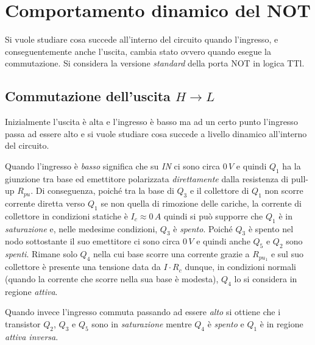 \documentclass[12pt, a4paper]{report}
\begin{document}
\section{Comportamento dinamico del NOT}
Si vuole studiare cosa succede all'interno del circuito quando l'ingresso, e conseguentemente anche l'uscita, cambia stato ovvero quando esegue la commutazione. Si considera la versione \textit{standard} della porta NOT in logica TTl.

\subsection{Commutazione dell'uscita $H \rightarrow L$}
Inizialmente l'uscita è alta e l'ingresso è basso ma ad un certo punto l'ingresso passa ad essere alto e si vuole studiare cosa succede a livello dinamico all'interno del circuito. 

Quando l'ingresso è \textit{basso} significa che su \textit{IN} ci sono circa $0\,V$ e quindi $Q_1$ ha la giunzione tra base ed emettitore polarizzata \textit{direttamente} dalla resistenza di pull-up $R_{pu}$. Di conseguenza, poiché tra la base di $Q_3$ e il collettore di $Q_1$ non scorre corrente diretta verso $Q_1$ se non quella di rimozione delle cariche, la corrente di collettore in condizioni statiche è $I_{c} \approx 0\,A$ quindi si può supporre che $Q_1$ è in \textit{saturazione} e, nelle medesime condizioni, $Q_3$ è \textit{spento}. Poiché $Q_3$ è spento nel nodo sottostante il suo emettitore ci sono circa $0\,V$ e quindi anche $Q_5$ e $Q_2$ sono \textit{spenti}. Rimane solo $Q_4$ nella cui base scorre una corrente grazie a $R_{pu_{1}}$ e sul suo collettore è presente una tensione data da $I \cdot R_c$ dunque, in condizioni normali (quando la corrente che scorre nella sua base è modesta), $Q_4$ lo si considera in regione \textit{attiva}.

Quando invece l'ingresso commuta passando ad essere \textit{alto} si ottiene che i transistor $Q_2$, $Q_3$ e $Q_5$ sono in \textit{saturazione} mentre $Q_4$ è \textit{spento} e $Q_1$ è in regione \textit{attiva inversa}.
\end{document}
